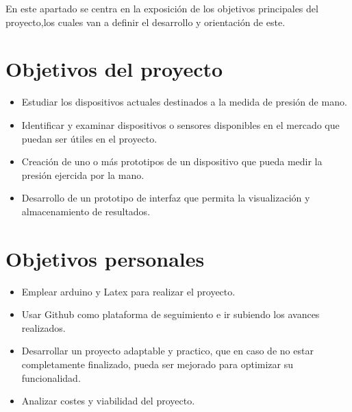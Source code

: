 En este apartado se centra en la exposición de los objetivos principales del proyecto,los cuales van a definir el desarrollo y orientación de este.
\section{Objetivos del proyecto}
\begin{itemize}
    \item Estudiar los dispositivos actuales destinados a la medida de presión de mano.
    \item Identificar y examinar dispositivos o sensores disponibles en el mercado que puedan ser útiles en el proyecto.
    \item Creación de uno o más prototipos de un dispositivo que pueda medir la presión ejercida por la mano.
    \item Desarrollo de un prototipo de interfaz que permita la visualización y almacenamiento de resultados.
\end{itemize}
\section{Objetivos personales}
\begin{itemize}
    \item Emplear arduino y Latex para realizar el proyecto. 
    \item Usar Github como plataforma de seguimiento e ir subiendo los avances realizados.
    \item Desarrollar un proyecto adaptable y practico, que en caso de no estar completamente finalizado, pueda ser mejorado para optimizar su funcionalidad.
    \item Analizar costes y viabilidad del proyecto.
\end{itemize}